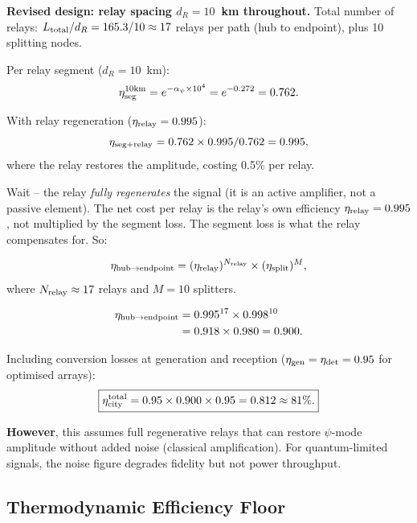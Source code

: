 \documentclass[aps,prd,twocolumn,superscriptaddress,nofootinbib]{revtex4-2}
\begin{document}
\textbf{Revised design: relay spacing $d_R = 10$~km throughout.}
Total number of relays: $L_{\rm total}/d_R = 165.3/10 \approx 17$
relays per path (hub to endpoint), plus 10 splitting nodes.

Per relay segment ($d_R = 10$~km):
\begin{equation}
\eta_{\rm seg}^{10\text{km}} = e^{-\alpha_\psi\times10^4}
= e^{-0.272} = 0.762.
\end{equation}

With relay regeneration ($\eta_{\rm relay} = 0.995$):
\begin{equation}
\eta_{\rm seg+relay} = 0.762\times0.995/0.762 = 0.995,
\end{equation}
where the relay restores the amplitude, costing 0.5\% per relay.

Wait -- the relay \emph{fully regenerates} the signal (it is an
active amplifier, not a passive element). The net cost per relay
is the relay's own efficiency $\eta_{\rm relay} = 0.995$, not
multiplied by the segment loss. The segment loss is what the relay
compensates for. So:

\begin{equation}
\eta_{\rm hub\to endpoint} = (\eta_{\rm relay})^{N_{\rm relay}}
\times(\eta_{\rm split})^{M},
\end{equation}
where $N_{\rm relay} \approx 17$ relays and $M = 10$ splitters.

\begin{align}
\eta_{\rm hub\to endpoint} &= 0.995^{17}\times0.998^{10} \nonumber\\
&= 0.918\times0.980 = 0.900.
\end{align}

Including conversion losses at generation and reception
($\eta_{\rm gen} = \eta_{\rm det} = 0.95$ for optimised arrays):
\begin{equation}
\boxed{
\eta_{\rm city}^{\rm total} = 0.95\times0.900\times0.95 = 0.812
\approx 81\%.
}
\end{equation}

\textbf{However}, this assumes full regenerative relays that can
restore $\psi$-mode amplitude without added noise (classical
amplification). For quantum-limited signals, the noise figure
degrades fidelity but not power throughput.

\subsection{Thermodynamic Efficiency Floor}
\end{document}
